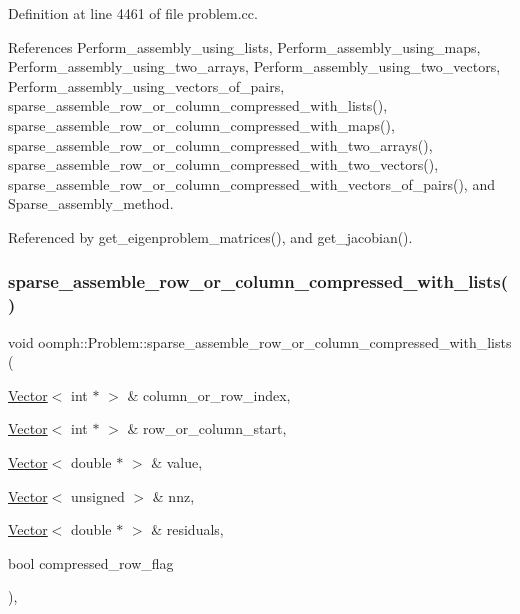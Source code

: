 Definition at line 4461 of file problem.\+cc.



References Perform\+\_\+assembly\+\_\+using\+\_\+lists, Perform\+\_\+assembly\+\_\+using\+\_\+maps, Perform\+\_\+assembly\+\_\+using\+\_\+two\+\_\+arrays, Perform\+\_\+assembly\+\_\+using\+\_\+two\+\_\+vectors, Perform\+\_\+assembly\+\_\+using\+\_\+vectors\+\_\+of\+\_\+pairs, sparse\+\_\+assemble\+\_\+row\+\_\+or\+\_\+column\+\_\+compressed\+\_\+with\+\_\+lists(), sparse\+\_\+assemble\+\_\+row\+\_\+or\+\_\+column\+\_\+compressed\+\_\+with\+\_\+maps(), sparse\+\_\+assemble\+\_\+row\+\_\+or\+\_\+column\+\_\+compressed\+\_\+with\+\_\+two\+\_\+arrays(), sparse\+\_\+assemble\+\_\+row\+\_\+or\+\_\+column\+\_\+compressed\+\_\+with\+\_\+two\+\_\+vectors(), sparse\+\_\+assemble\+\_\+row\+\_\+or\+\_\+column\+\_\+compressed\+\_\+with\+\_\+vectors\+\_\+of\+\_\+pairs(), and Sparse\+\_\+assembly\+\_\+method.



Referenced by get\+\_\+eigenproblem\+\_\+matrices(), and get\+\_\+jacobian().

\mbox{\label{classoomph_1_1Problem_a18867724e4682e69f10fe19d7a20116d}} 
\subsubsection{\texorpdfstring{sparse\+\_\+assemble\+\_\+row\+\_\+or\+\_\+column\+\_\+compressed\+\_\+with\+\_\+lists()}{sparse\_assemble\_row\_or\_column\_compressed\_with\_lists()}}
{\footnotesize\ttfamily void oomph\+::\+Problem\+::sparse\+\_\+assemble\+\_\+row\+\_\+or\+\_\+column\+\_\+compressed\+\_\+with\+\_\+lists (\begin{DoxyParamCaption}\item[{\hyperlink{classoomph_1_1Vector}{Vector}$<$ int $\ast$ $>$ \&}]{column\+\_\+or\+\_\+row\+\_\+index,  }\item[{\hyperlink{classoomph_1_1Vector}{Vector}$<$ int $\ast$ $>$ \&}]{row\+\_\+or\+\_\+column\+\_\+start,  }\item[{\hyperlink{classoomph_1_1Vector}{Vector}$<$ double $\ast$ $>$ \&}]{value,  }\item[{\hyperlink{classoomph_1_1Vector}{Vector}$<$ unsigned $>$ \&}]{nnz,  }\item[{\hyperlink{classoomph_1_1Vector}{Vector}$<$ double $\ast$ $>$ \&}]{residuals,  }\item[{bool}]{compressed\+\_\+row\+\_\+flag }\end{DoxyParamCaption})\hspace{0.3cm}{\ttfamily [private]}, {\ttfamily [virtual]}}



